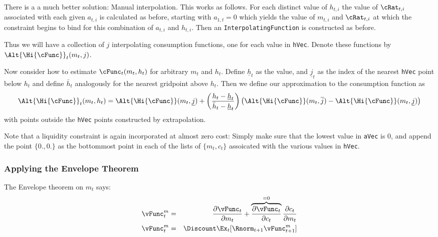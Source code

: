 \documentclass[titlepage]{\econtex}
\begin{document}
{There is a a much better solution: Manual interpolation.  This works
as follows.  For each distinct value of $h_{t,i}$ the value of
${\cRat}_{t,i}$ associated with each given ${a}_{t,i}$ is
calculated as before, starting with ${a}_{1,t}=0$ which yields
the value of ${m}_{t,i}$ and ${\cRat}_{t,i}$ at which the
constraint begins to bind for this combination of ${a}_{t,i}$
and $h_{t,i}$.  Then an \texttt{InterpolatingFunction} is
constructed as before.

Thus we will have a collection of $j$ interpolating consumption
functions, one for each value in \texttt{hVec}.  Denote these
functions by $\Alt{\Hi{\cFunc}}_{t}({m}_{t},j)$.

Now consider how to estimate $\cFunc_{t}({m}_{t},h_{t})$ for arbitrary
${m}_{t}$ and $h_{t}$.  Define $\underline{h}_{t}$ as the value, and
$\underline{j}_{t}$ as the index of the nearest \texttt{hVec} point
below $h_{t}$ and define $\bar{h}_{t}$ analogously for the nearest
gridpoint above $h_{t}$.  Then we define our approximation to the
consumption function as
\begin{displaymath}
        \Alt{\Hi{\cFunc}}_{t}({m}_{t},h_{t}) =
        \Alt{\Hi{\cFunc}}({m}_{t},\underline{j})+\left(\frac{h_{t}-\underline{h}_{t}}
        {\bar{h}_{t}-\underline{h}_{t}}\right)
        \left(\Alt{\Hi{\cFunc}}({m}_{t},\overline{j})
        -\Alt{\Hi{\cFunc}}({m}_{t},\underline{j})\right)
\end{displaymath}
with points outside the \texttt{hVec} points constructed by
extrapolation.

Note that a liquidity constraint is again incorporated at almost
zero cost: Simply make sure that the lowest value in
\texttt{aVec} is 0, and append the point $\{0.,0.\}$ as the
bottommost point in each of the lists of $\{{m}_{t},{c}_{t}\}$
assoicated with the various values in \texttt{hVec}.

\hypertarget{Applying-the-Envelope-Theorem}{}
\subsubsection{Applying the Envelope Theorem}
The Envelope theorem on ${m}_{t}$ says:
\begin{eqnarray}
{\vFunc}^{m}_{t} & = & \frac{\partial {\vFunc}_{t}}{\partial {m}_{t}} + \overbrace{\frac{\partial {\vFunc}_{t}}{\partial {c}_{t}}}^{=0}\frac{\partial {c}_{t}}{\partial {m}_{t}} \label{eq:vxt} \\
{\vFunc}_{t}^{m} & = & \Discount  \Ex_{t} [\Rnorm_{t+1} {\vFunc}_{t+1}^{m}] \label{eq:envelopex}
\end{eqnarray}

}
\end{document}
